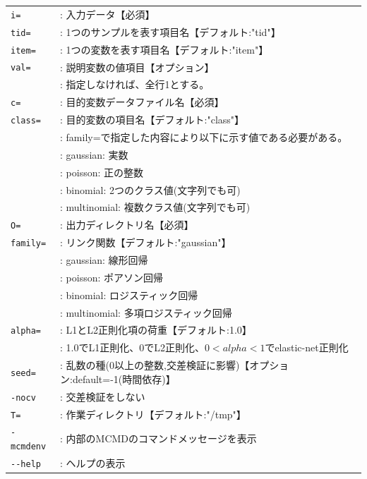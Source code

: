 \begin{table}[htbp]
{\small
\begin{tabular}{ll}
\verb|i=|      & : 入力データ【必須】 \\
\verb|tid=|    & : 1つのサンプルを表す項目名【デフォルト:"tid"】 \\
\verb|item=|   & : 1つの変数を表す項目名【デフォルト:"item"】 \\
\verb|val=|    & : 説明変数の値項目【オプション】 \\
               & : 指定しなければ、全行1とする。 \\
\verb|c=|      & : 目的変数データファイル名【必須】 \\
\verb|class=|  & : 目的変数の項目名【デフォルト:"class"】 \\
               & : family=で指定した内容により以下に示す値である必要がある。 \\
               & :   gaussian: 実数 \\
               & :   poisson: 正の整数 \\
               & :   binomial: 2つのクラス値(文字列でも可) \\
               & :   multinomial: 複数クラス値(文字列でも可) \\
\verb|O=|      & : 出力ディレクトリ名【必須】 \\
\verb|family=| & : リンク関数【デフォルト:"gaussian"】 \\
               & : gaussian: 線形回帰 \\
               & : poisson: ポアソン回帰 \\
               & : binomial: ロジスティック回帰 \\
               & : multinomial: 多項ロジスティック回帰 \\
\verb|alpha=|  & : L1とL2正則化項の荷重【デフォルト:1.0】 \\
               & : 1.0でL1正則化、0でL2正則化、$0<alpha<1$でelastic-net正則化 \\
\verb|seed=|   & : 乱数の種(0以上の整数,交差検証に影響)【オプション:default=-1(時間依存)】 \\
\verb|-nocv|   & : 交差検証をしない \\
\verb|T=|      & : 作業ディレクトリ【デフォルト:"/tmp"】 \\
\verb|-mcmdenv|& : 内部のMCMDのコマンドメッセージを表示 \\
\verb|--help|  & : ヘルプの表示

\end{tabular} 
}
\end{table} 

